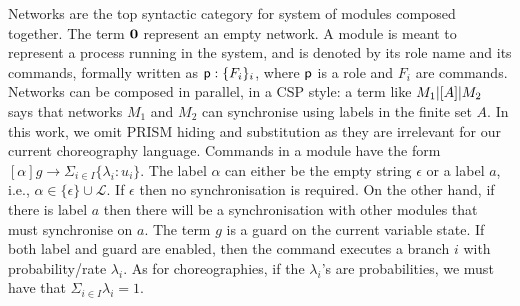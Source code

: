 Networks are the top syntactic category for system of modules composed
together. The term $\mathbf{0}$ represent an empty network. A module is
meant to represent a process running in the system, and is denoted by
its role name and its commands, formally written as
$\mathsf{p}:\{F_i\}_i$, where $\mathsf{p}$ is a role and $F_i$ are
commands. Networks can be composed in parallel, in a CSP style: a term
like $M_1 |[A]| M_2$ says that networks $M_1$ and $M_2$ can
synchronise using labels in the finite set $A$.
%
In this work, we omit PRISM hiding and substitution as they are
irrelevant for our current choreography language.
%
Commands in a module have the form
$[\alpha] g \rightarrow \Sigma_{i\in I}\{\lambda_i: u_i\}$. The label
$\alpha$ can either be the empty string $\epsilon$ or a label $a$,
i.e., $\alpha\in\{\epsilon\}\cup \mathcal L$. If $\epsilon$ then no
synchronisation is required. On the other hand, if there is label $a$
then there will be a synchronisation with other modules that must
synchronise on $a$. The term $g$ is a guard on the current variable
state. If both label and guard are enabled, then the command executes
a branch $i$ with probability/rate $\lambda_i$. As for choreographies,
if the $\lambda_i$'s are probabilities, we must have that
$\Sigma_{i\in I}\lambda_i=1$.

